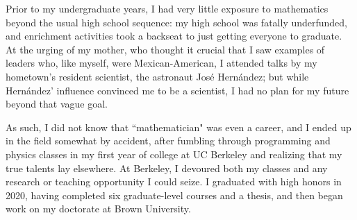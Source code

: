 \documentclass[12pt]{article}
\begin{document}
%
%
%
%
%
%

Prior to my undergraduate years, I had very little exposure to mathematics beyond the usual high school sequence: my high school was fatally underfunded, and enrichment activities took a backseat to just getting everyone to graduate.
At the urging of my mother, who thought it crucial that I saw examples of leaders who, like myself, were Mexican-American, I attended talks by my hometown's resident scientist, the astronaut Jos\'e Hern\'andez; but while Hern\'andez' influence convinced me to be a scientist, I had no plan for my future beyond that vague goal.

As such, I did not know that ``mathematician" was even a career, and I ended up in the field somewhat by accident, after fumbling through programming and physics classes in my first year of college at UC Berkeley and realizing that my true talents lay elsewhere.
At Berkeley, I devoured both my classes and any research or teaching opportunity I could seize.
I graduated with high honors in 2020, having completed six graduate-level courses and a thesis, and then began work on my doctorate at Brown University.
\end{document}
